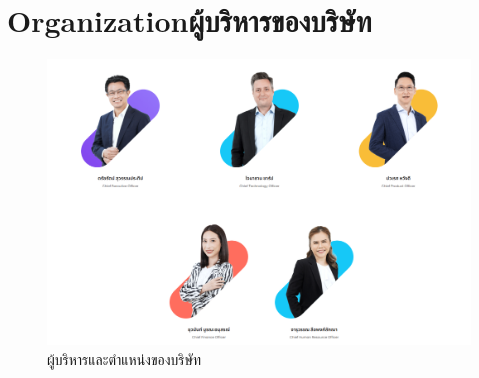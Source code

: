 \section{\ifenglish Organization\else ผู้บริหารของบริษัท\fi}
\begin{figure}[ht]
    \begin{center}
    \includegraphics[scale=0.3]{images/org.png}
    \end{center}
    \caption[Board Of Director]{ผู้บริหารและตำแหน่งของบริษัท}
    \label{fig:org}
\end{figure}





